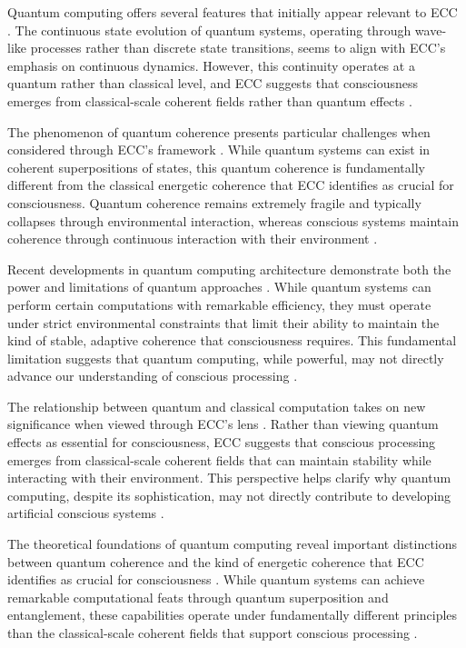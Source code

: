 \begin{refsection}
Quantum computing offers several features that initially appear relevant to ECC \cite{Bernstein2018}. The continuous state evolution of quantum systems, operating through wave-like processes rather than discrete state transitions, seems to align with ECC's emphasis on continuous dynamics. However, this continuity operates at a quantum rather than classical level, and ECC suggests that consciousness emerges from classical-scale coherent fields rather than quantum effects \cite{Deutsch2020}.

The phenomenon of quantum coherence presents particular challenges when considered through ECC's framework \cite{DiVincenzo2019}. While quantum systems can exist in coherent superpositions of states, this quantum coherence is fundamentally different from the classical energetic coherence that ECC identifies as crucial for consciousness. Quantum coherence remains extremely fragile and typically collapses through environmental interaction, whereas conscious systems maintain coherence through continuous interaction with their environment \cite{Harrow2020}.

Recent developments in quantum computing architecture demonstrate both the power and limitations of quantum approaches \cite{Kitaev2018}. While quantum systems can perform certain computations with remarkable efficiency, they must operate under strict environmental constraints that limit their ability to maintain the kind of stable, adaptive coherence that consciousness requires. This fundamental limitation suggests that quantum computing, while powerful, may not directly advance our understanding of conscious processing \cite{Montanaro2021}.

The relationship between quantum and classical computation takes on new significance when viewed through ECC's lens \cite{Nielsen2020}. Rather than viewing quantum effects as essential for consciousness, ECC suggests that conscious processing emerges from classical-scale coherent fields that can maintain stability while interacting with their environment. This perspective helps clarify why quantum computing, despite its sophistication, may not directly contribute to developing artificial conscious systems \cite{Preskill2019}.

The theoretical foundations of quantum computing reveal important distinctions between quantum coherence and the kind of energetic coherence that ECC identifies as crucial for consciousness \cite{Shor2019}. While quantum systems can achieve remarkable computational feats through quantum superposition and entanglement, these capabilities operate under fundamentally different principles than the classical-scale coherent fields that support conscious processing \cite{Svore2020}.


\end{refsection}
